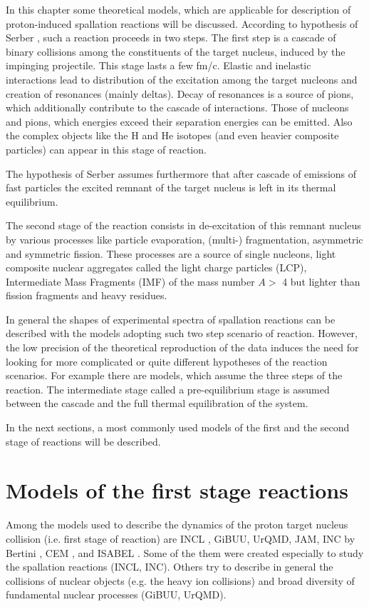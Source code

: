 In this chapter some theoretical models, which are applicable for description 
of proton-induced spallation reactions will be discussed. 
According to hypothesis of Serber \cite{Serber}, such a reaction proceeds in two steps. 
The first step is a cascade of binary collisions 
among the constituents of the target nucleus, induced by the impinging projectile. 
This stage lasts a few fm/c.
Elastic and inelastic interactions lead to distribution of the excitation among the target nucleons and creation of resonances (mainly deltas). 
Decay of resonances is a source of pions, which additionally contribute to the cascade of interactions. Those of nucleons and pions, which energies exceed their separation energies can be emitted. Also the complex objects like the H and He isotopes (and even heavier composite particles) 
can appear in this stage of reaction. 

The hypothesis of Serber assumes furthermore that after cascade of emissions of fast particles the
excited remnant of the target nucleus is left in its thermal equilibrium.  

The second stage of the reaction consists in de-excitation of this remnant nucleus by various processes like 
particle evaporation, (multi-) fragmentation, asymmetric and symmetric fission. 
These processes are a source of single nucleons, light composite nuclear aggregates called the light charge particles (LCP), Intermediate Mass Fragments (IMF) of the mass number $A > $ 4 but lighter than fission fragments and  heavy residues.

In general the shapes of experimental spectra of spallation reactions can be described with the models adopting such two step scenario of reaction.
However, the low precision of the theoretical reproduction of the data induces the need for looking for more complicated or quite different hypotheses 
of the reaction scenarios. For example there are models, which assume the three steps of the reaction.
The intermediate stage called a pre-equilibrium stage is assumed between the cascade and the full thermal equilibration of the system. 

In the next sections, a most commonly used models of the first and the second stage of reactions will be described.

\section{Models of the first stage reactions}

Among the models used to describe the dynamics of the proton target nucleus collision (i.e. first stage of reaction) are 
INCL \cite{INCLCugnon1981,INCLboudard2002intranuclear,INCLboudard2004new,INCLboudard2013new,INCLMancusi2014}, 
GiBUU\cite{GiBUUBuss2012}, UrQMD\cite{UrQMDBASS1998,UrQMDBleicher1999}, 
JAM\cite{JAM_NARA1999}, 
INC by Bertini \cite{Bertini1963,Bertini1969}, 
CEM \cite{CEM_GUDIMA1983}, 
and ISABEL \cite{Isabel_Yariv1979,Isabel_Yariv1981}. 
Some of the them were created especially to study the spallation reactions (INCL, INC). Others try to describe 
in general the collisions of nuclear objects (e.g. the heavy ion collisions) and broad diversity of fundamental 
nuclear processes (GiBUU, UrQMD).

